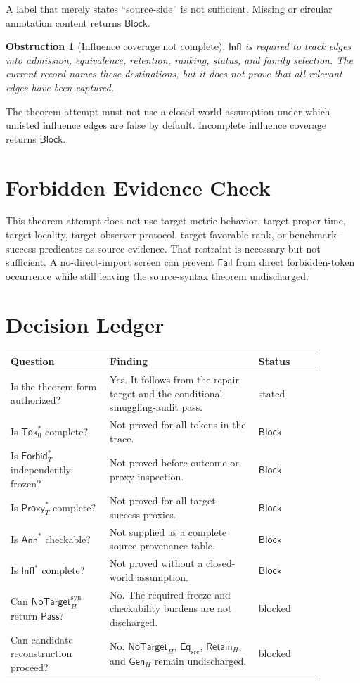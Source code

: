 \documentclass[11pt]{article}
\newcommand{\GenH}{\mathsf{Gen}_{H}}
\newcommand{\EqSrc}{\mathsf{Eq}_{\mathrm{src}}}
\newcommand{\RetainH}{\mathsf{Retain}_{H}}
\newcommand{\NoTargetH}{\mathsf{NoTarget}_{H}}
\newcommand{\NoTargetSyn}{\mathsf{NoTarget}_{H}^{\mathrm{syn}}}
\newcommand{\SrcTok}{\mathsf{Tok}_{0}}
\newcommand{\ForbidT}{\mathsf{Forbid}_{T}}
\newcommand{\ProxyT}{\mathsf{Proxy}_{T}}
\newcommand{\Annot}{\mathsf{Ann}}
\newcommand{\Influence}{\mathsf{Infl}}
\newcommand{\Pass}{\mathsf{Pass}}
\newcommand{\Fail}{\mathsf{Fail}}
\newcommand{\Block}{\mathsf{Block}}
\newtheorem{obstruction}{Obstruction}
\begin{document}
A label that merely states ``source-side'' is not sufficient. Missing or
circular annotation content returns \(\Block\).

\begin{obstruction}[Influence coverage not complete]
\(\Influence\) is required to track edges into admission, equivalence,
retention, ranking, status, and family selection. The current record names
these destinations, but it does not prove that all relevant edges have been
captured.
\end{obstruction}

The theorem attempt must not use a closed-world assumption under which
unlisted influence edges are false by default. Incomplete influence coverage
returns \(\Block\).

\section{Forbidden Evidence Check}

This theorem attempt does not use target metric behavior, target proper
time, target locality, target observer protocol, target-favorable rank, or
benchmark-success predicates as source evidence. That restraint is
necessary but not sufficient. A no-direct-import screen can prevent
\(\Fail\) from direct forbidden-token occurrence while still leaving the
source-syntax theorem undischarged.

\section{Decision Ledger}

\begin{center}
\begin{tabular}{p{0.28\linewidth}p{0.42\linewidth}p{0.18\linewidth}}
\textbf{Question} & \textbf{Finding} & \textbf{Status} \\
\hline
Is the theorem form authorized? & Yes. It follows from the repair target and the conditional smuggling-audit pass. & stated \\
Is \(\SrcTok^{*}\) complete? & Not proved for all tokens in the trace. & \(\Block\) \\
Is \(\ForbidT^{*}\) independently frozen? & Not proved before outcome or proxy inspection. & \(\Block\) \\
Is \(\ProxyT^{*}\) complete? & Not proved for all target-success proxies. & \(\Block\) \\
Is \(\Annot^{*}\) checkable? & Not supplied as a complete source-provenance table. & \(\Block\) \\
Is \(\Influence^{*}\) complete? & Not proved without a closed-world assumption. & \(\Block\) \\
Can \(\NoTargetSyn\) return \(\Pass\)? & No. The required freeze and checkability burdens are not discharged. & blocked \\
Can candidate reconstruction proceed? & No. \(\NoTargetH\), \(\EqSrc\), \(\RetainH\), and \(\GenH\) remain undischarged. & blocked \\
\end{tabular}
\end{center}
\end{document}
